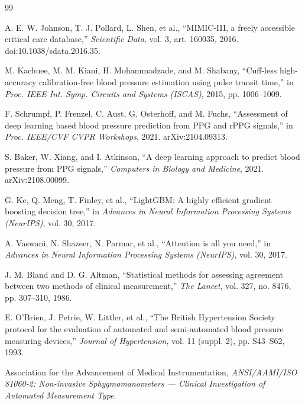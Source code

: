 \documentclass[12pt,a4paper]{report}
\begin{document}
\begin{thebibliography}{99}
 A. E. W. Johnson, T. J. Pollard, L. Shen, et al.,
``MIMIC-III, a freely accessible critical care database,''
\textit{Scientific Data}, vol. 3, art. 160035, 2016.
doi:10.1038/sdata.2016.35.

 M. Kachuee, M. M. Kiani, H. Mohammadzade, and M. Shabany,
``Cuff-less high-accuracy calibration-free blood pressure estimation using pulse
transit time,'' in \textit{Proc. IEEE Int. Symp. Circuits and Systems (ISCAS)},
2015, pp. 1006--1009.

 F. Schrumpf, P. Frenzel, C. Aust, G. Osterhoff, and M. Fuchs,
``Assessment of deep learning based blood pressure prediction from PPG and rPPG
signals,'' in \textit{Proc. IEEE/CVF CVPR Workshops}, 2021.
arXiv:2104.09313.

 S. Baker, W. Xiang, and I. Atkinson,
``A deep learning approach to predict blood pressure from PPG signals,''
\textit{Computers in Biology and Medicine}, 2021. arXiv:2108.00099.

 G. Ke, Q. Meng, T. Finley, et al.,
``LightGBM: A highly efficient gradient boosting decision tree,'' in
\textit{Advances in Neural Information Processing Systems (NeurIPS)}, vol. 30,
2017.

 A. Vaswani, N. Shazeer, N. Parmar, et al.,
``Attention is all you need,'' in \textit{Advances in Neural Information
Processing Systems (NeurIPS)}, vol. 30, 2017.

 J. M. Bland and D. G. Altman,
``Statistical methods for assessing agreement between two methods of clinical
measurement,'' \textit{The Lancet}, vol. 327, no. 8476, pp. 307--310, 1986.

 E. O'Brien, J. Petrie, W. Littler, et al.,
``The British Hypertension Society protocol for the evaluation of automated and
semi-automated blood pressure measuring devices,''
\textit{Journal of Hypertension}, vol. 11 (suppl. 2), pp. S43--S62, 1993.

 Association for the Advancement of Medical Instrumentation,
\textit{ANSI/AAMI/ISO 81060-2: Non-invasive Sphygmomanometers --- Clinical
Investigation of Automated Measurement Type}.


\end{thebibliography}
\end{document}
